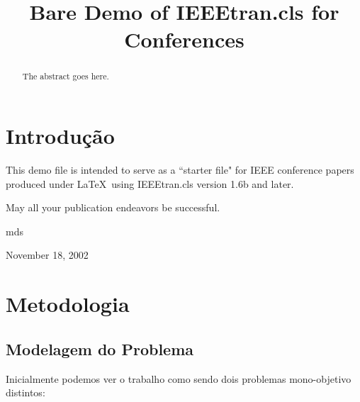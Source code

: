 \documentclass[conference]{IEEEtran}
\begin{document}
\title{Bare Demo of IEEEtran.cls for Conferences}


\author{
\and
{}
\and
{}
}

\maketitle

\begin{abstract}
The abstract goes here.
\end{abstract}

\section{Introdução}
This demo file is intended to serve as a ``starter file"
for IEEE conference papers produced under \LaTeX\ using IEEEtran.cls version
1.6b and later.

 May all your publication endeavors be successful.

\hfill mds
 
\hfill November 18, 2002

\section{Metodologia}


\subsection{Modelagem do Problema}
Inicialmente podemos ver o trabalho como sendo dois problemas mono-objetivo distintos:
\end{document}
